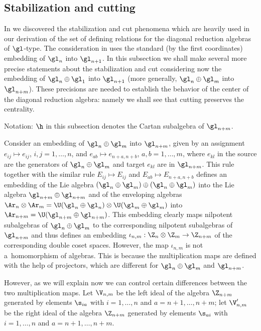 \subsection{Stabilization and cutting} \label{subsection3.4}

In \cite{KO3} we discovered the stabilization and cut phenomena which are heavily used in our derivation of the set of def\/ining relations for the
diagonal reduction algebras of $\gl$-type. The consideration in \cite{KO3} uses the standard (by the f\/irst coordinates) embedding of $\gl_n$ into $\gl_{n+1}$.
In this subsection we shall make several more precise statements about the stabilization and cut considering now the embedding of $\gl_n\oplus\gl_1$
into $\gl_{n+1}$ (more generally, $\gl_n\oplus\gl_m$ into $\gl_{n+m}$). These precisions are needed to establish the behavior of the center of
the diagonal reduction algebra: namely we shall see that cutting preserves the centrality.


Notation: $\h$ in this subsection denotes the Cartan subalgebra of $\gl_{n+m}$.


Consider an embedding of $\gl_n\oplus \gl_m$ into $\gl_{n+m}$, given by an assignment $e_{ij}\mapsto e_{ij}$, $i,j=1,\ldots,n$, and
$e_{ab}\mapsto e_{n+a,n+b}$, $a,b=1,\ldots,m$, where $e_{kl}$ in the source are the generators of $\gl_n\oplus \gl_m$ and target $e_{kl}$
are in $\gl_{n+m}$. This rule together with the similar rule $E_{ij}\mapsto E_{ij}$ and $E_{ab}\mapsto E_{n+a,n+b}$ def\/ines an embedding of the Lie
algebra $(\gl_n\oplus \gl_m)\oplus(\gl_n\oplus \gl_m)$ into the Lie algebra $\gl_{n+m}\oplus\gl_{n+m}$ and of the enveloping algebras
$\Ar_n\otimes \Ar_m=\U(\gl_n\oplus\gl_n)\otimes \U(\gl_m\oplus\gl_m)$ into $\Ar_{n+m}=\U(\gl_{n+m}\oplus\gl_{n+m})$. This embedding clearly
maps nilpotent subalgebras of $\gl_n\oplus \gl_m$ to the corresponding nilpotent subalgebras of $\gl_{n+m}$ and thus def\/ines an embedding
$\iota_{n,m}:\Z_n\otimes\Z_m\to \Z_{n+m}$ of the corresponding double coset spaces. However, the map $\iota_{n,m}$ is not a~homomorphism of
algebras. This is because the multiplication maps are def\/ined with the help of projectors, which are dif\/ferent for $\gl_n\oplus \gl_m$ and $\gl_{n+m}$.


However, as we will explain now we can control certain dif\/ferences between the two multiplication maps. Let $\V_{n,m}$ be the left ideal of the
algebra $\Z_{n+m}$ generated by elements $\s_{ia}$ with $i=1,\ldots,n$ and $a=n+1,\ldots, n+m$; let  $\V_{n,m}'$ be the right ideal of the
algebra $\Z_{n+m}$ generated by elements $\s_{ai}$ with $i=1,\ldots, n$ and $a=n+1,\ldots, n+m$.


